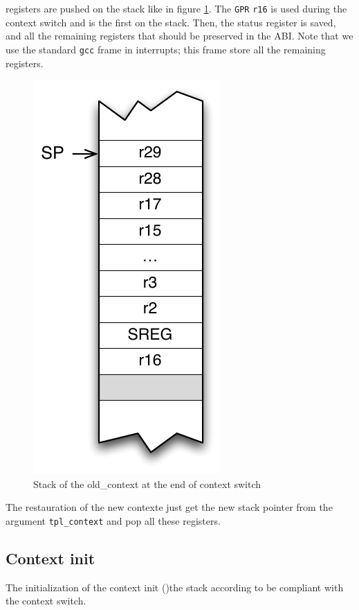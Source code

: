 registers are pushed on the stack like in figure \ref{fig:avr8-stackSave}. The \texttt{GPR} \texttt{r16} is used during the context switch and is the first on the stack. Then, the status register is saved, and all the remaining registers that should be preserved in the ABI. Note that we use the standard \texttt{gcc} frame in interrupts; this frame store all the remaining registers.

\begin{figure}[htbp] %
\begin{minipage}{0.4\textwidth}
    \centering
  \includegraphics[scale=.6]{pictures/avr8-stackSave.pdf} 
\end{minipage}
\begin{minipage}{0.6\textwidth}
  \caption{Stack of the old_context at the end of context switch}\label{fig:avr8-stackSave}
\end{minipage}
\end{figure}

The restauration of the new contexte just get the new stack pointer from the argument \texttt{tpl_context} and pop all these registers.

\subsection{Context init}
The initialization of the context init ()the stack according to be compliant with the context switch. 

